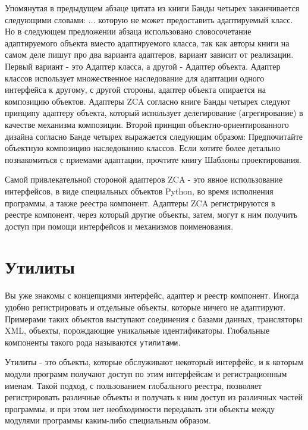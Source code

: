 \documentclass[a4paper,openany,twoside,draft]{book}
\begin{document}
Упомянутая в предыдущем абзаце цитата из книги Банды четырех
заканчивается следующими словами: \textquotedbl{} ... которую не может предоставить
адаптируемый класс\textquotedbl{}.  Но в следующем предложении абзаца использовано
словосочетание \textquotedbl{}адаптируемого объекта\textquotedbl{} вместо \textquotedbl{}адаптируемого класса\textquotedbl{},
так как авторы книги на самом деле пишут про два варианта адаптеров,
вариант зависит от реализации.  Первый вариант - это \textquotedbl{}Адаптер класса\textquotedbl{},
а другой - \textquotedbl{}Адаптер объекта\textquotedbl{}.  Адаптер классов использует
множественное наследование для адаптации одного интерфейса к другому,
с другой стороны, адаптер объекта опирается на композицию объектов.
Адаптеры ZCA согласно книге Банды четырех следуют принципу адаптеру
объекта, который использует делегирование (агрегирование) в качестве
механизма композиции.  Второй принцип объектно-ориентированного
дизайна согласно Банде четырех выражается следующим образом:
\textquotedbl{}Предпочитайте объектную композицию наследованию классов\textquotedbl{}.  Если
хотите более детально познакомиться с приемами адаптации, прочтите
книгу \textquotedbl{}Шаблоны проектирования\textquotedbl{}.

Самой привлекательной стороной адаптеров ZCA - это явное использование
интерфейсов, в виде специальных объектов Python, во время исполнения
программы, а также реестра компонент.  Адаптеры ZCA регистрируются в
реестре компонент, через который другие объекты, затем, могут к ним
получить доступ при помощи интерфейсов и механизмов поименования.


\chapter{Утилиты%
  \label{id39}%
}


Вы уже знакомы с концепциями \textquotedbl{}интерфейс\textquotedbl{}\textquotedbl{}, \textquotedbl{}адаптер\textquotedbl{} и \textquotedbl{}реестр
компонент\textquotedbl{}.  Иногда удобно регистрировать и отдельные объекты, которые
ничего не адаптируют.  Примерами таких объектов выступают соединения с
базами данных, трансляторы XML, объекты, порождающие уникальные
идентификаторы.  Глобальные компоненты такого рода называются
\texttt{утилитами}.

Утилиты - это объекты, которые обслуживают некоторый интерфейс, и к
которым модули программ получают доступ по этим интерфейсам и
регистрационным именам.  Такой подход, с пользованием глобального
реестра, позволяет регистрировать различные объекты и получать к ним
доступ из различных частей программы, и при этом нет необходимости
передавать эти объекты между модулями программы каким-либо специальным
образом.
\end{document}
